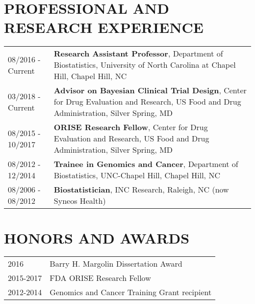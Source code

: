 \documentclass[11pt]{article}
\begin{document}
\section*{\large \bf PROFESSIONAL AND RESEARCH EXPERIENCE}
\begin{flushleft}
\begin{tabular}[!h]{p{3cm}p{12.8cm}}
08/2016 - Current & \textbf{Research Assistant Professor}, Department of Biostatistics, University of North Carolina at Chapel Hill, Chapel Hill, NC \vspace{10pt} \\

03/2018 - Current & \textbf{Advisor on Bayesian Clinical Trial Design}, Center for Drug Evaluation and Research, US Food and Drug Administration, Silver Spring, MD \vspace{10pt} \\

08/2015 - 10/2017 & \textbf{ORISE Research Fellow}, Center for Drug Evaluation and Research, US Food and Drug Administration, Silver Spring, MD \vspace{10pt} \\

08/2012 - 12/2014 & \textbf{Trainee in Genomics and Cancer}, Department of Biostatistics, UNC-Chapel Hill, Chapel Hill, NC \vspace{5pt}\\

08/2006 - 08/2012 & \textbf{Biostatistician}, INC Research, Raleigh, NC (now Syneos Health) \vspace{5pt}\\ 
\end{tabular}
\end{flushleft}

\section*{\large \bf HONORS AND AWARDS}
\begin{flushleft}
\begin{tabular}[!h]{p{3cm}p{12.8cm}}
2016      & Barry H. Margolin Dissertation Award \vspace{5pt} \\
2015-2017 & FDA ORISE Research Fellow \vspace{5pt} \\
2012-2014 & Genomics and Cancer Training Grant recipient \vspace{5pt} \\
\end{tabular}
\end{flushleft}
\end{document}
